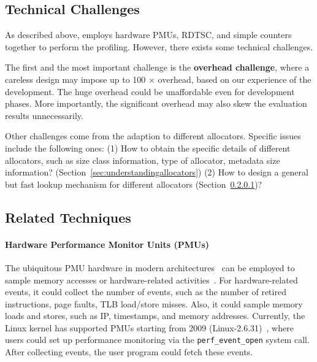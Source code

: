 \subsection{Technical Challenges}

As described above, \MP{} employs hardware PMUs, RDTSC, and simple counters together to perform the profiling. However, there exists some technical challenges. 

The first and the most important challenge is the \textbf{overhead challenge}, where a careless design may impose up to 100 $\times$ overhead, based on our experience of the development. The huge overhead could be unaffordable even for development phases. More importantly, the significant overhead may also skew the evaluation results unnecessarily. 

Other challenges come from the adaption to different allocators. Specific issues include the following ones: (1) How to obtain the specific details of different allocators, such as size class information, type of allocator, metadata size information? (Section~\ref{sec:understandingallocators}) (2) How to design a general but fast lookup mechanism for different allocators (Section~\ref{})? %


\subsection{Related Techniques}
\label{sec:pmu}

\paragraph{Hardware Performance Monitor Units (PMUs)} The ubiquitous PMU hardware in modern architectures~\cite{AMDIBS:07, IntelArch:PEBS:Sept09, armpmu} can be employed to sample memory accesses or hardware-related activities~\cite{DBLP:conf/sc/ItzkowitzWAK03, ibs-sc, ibs-pact, Sheng:2011:RLN:1985793.1985848, LASER, Cheetah}. For hardware-related events, it could collect the number of events, such as the number of retired instructions, page faults, TLB load/store misses. Also, it could sample  memory loads and stores, such as IP, timestamps, and memory addresses. Currently, the Linux kernel has supported PMUs starting from 2009 (Linux-2.6.31)~\cite{pmulinuxsupport}, where users could set up performance monitoring via  the \texttt{perf\_event\_open} system call. After collecting events, the user program could fetch these events. 

